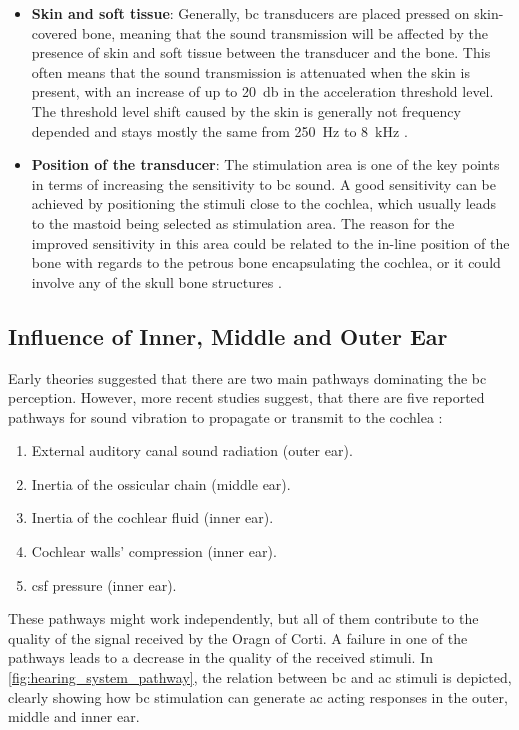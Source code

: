 \begin{itemize}
\item \textbf{Skin and soft tissue}: Generally, \gls{bc} transducers are placed pressed on skin-covered bone, meaning that the sound transmission will be affected by the presence of skin and soft tissue between the transducer and the bone. This often means that the sound transmission is attenuated when the skin is present, with an increase of up to \SI{20}{\decibel} in the acceleration threshold level. The threshold level shift caused by the skin is generally not frequency depended and stays mostly the same from \SI{250}{\hertz} to \SI{8}{\kilo\hertz} \citep{hakansson_1985}.
\item \textbf{Position of the transducer}: The stimulation area is one of the key points in terms of increasing the sensitivity to \gls{bc} sound. A good sensitivity can be achieved by positioning the stimuli close to the cochlea, which usually leads to the mastoid being selected as stimulation area. The reason for the improved sensitivity in this area could be related to the in-line position of the bone with regards to the petrous bone encapsulating the cochlea, or it could involve any of the skull bone structures \citep{puria_2013}. 
\end{itemize}
\subsection{Influence of Inner, Middle and Outer Ear}

Early theories suggested that there are two main pathways dominating the \gls{bc} perception. However, more recent studies suggest, that there are five reported pathways for sound vibration to propagate or transmit to the cochlea \citep{zhang_2016}:
\begin{enumerate}
\item External auditory canal sound radiation (outer ear).
\item Inertia of the ossicular chain (middle ear).
\item Inertia of the cochlear fluid (inner ear).
\item Cochlear walls' compression (inner ear).
\item \gls{csf} pressure (inner ear).
\end{enumerate}

These pathways might work independently, but all of them contribute to the quality of the signal received by the Oragn of Corti. A failure in one of the pathways leads to a decrease in the quality of the received stimuli. In  \autoref{fig:hearing_system_pathway}, the relation between \gls{bc} and \gls{ac} stimuli is depicted, clearly showing how \gls{bc} stimulation can generate \gls{ac} acting responses in the outer, middle and inner ear.

